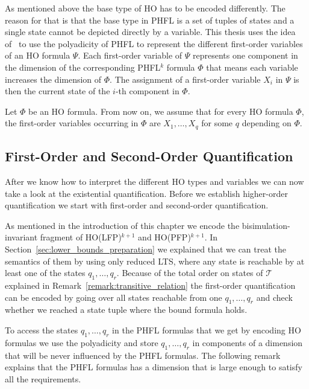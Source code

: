 As mentioned above the base type of HO has to be encoded differently. The reason for that is that the base type in PHFL is a
set of tuples of states and a single state cannot be depicted directly by a variable. This thesis uses the
idea of~\cite{lange2014capturing} to use the polyadicity of PHFL to represent the different first-order variables of an HO formula
$\Psi$. Each first-order variable of $\Psi$ represents one component in the dimension of the 
corresponding PHFL$^k$ formula $\Phi$ that
means each variable increases the dimension of $\Phi$. The assignment of a first-order 
variable $X_i$ in $\Psi$ is then the current state of the $i$-th component in $\Phi$.

Let $\Phi$ be an HO formula. From now on, we assume that for every HO formula $\Phi$, the first-order variables occurring in $\Phi$ are 
$X_1, \dots, X_q$ for some $q$ depending on $\Phi$.

\subsection{First-Order and Second-Order Quantification}\label{subsec:existentialQuantifiers}

After we know how to interpret the different HO types and variables we can now take a look at the existential quantification. Before we establish higher-order quantification we start with first-order and second-order quantification.

As mentioned in the introduction of this chapter we encode the bisimula\-tion-invariant fragment of HO(LFP)$^{k + 1}$ and HO(PFP)$^{k+1}$. In Section~\ref{sec:lower_bounds_preparation}  we explained that we can treat the semantics of them by using only reduced LTS, where any state is reachable by at least one of the states $q_1, \dots, q_r$. Because of the total order on states of $\mathcal{T}$ explained in Remark~\ref{remark:transitive_relation} the first-order
quantification can be encoded by going over all states reachable from one $q_1, \dots, q_r$ and check whether we
reached a state tuple where the bound formula holds.

To access the states $q_1, \dots, q_r$ in the PHFL formulas that we get by encoding HO 
formulas we use the polyadicity and store $q_1, \dots, q_r$ in components of a dimension that 
will be never influenced by the PHFL formulas. The following remark explains that the PHFL 
formulas has a dimension that is large enough to satisfy all the requirements. 

